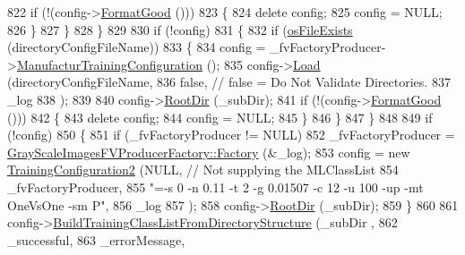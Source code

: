 \begin{DoxyCode}
822       \textcolor{keywordflow}{if}  (!(config->\hyperlink{class_k_k_b_1_1_configuration_a83da17732beb6179d42f73f699795b68}{FormatGood} ()))
823       \{
824         \textcolor{keyword}{delete}  config;
825         config = NULL;
826       \}
827     \}
828   \}
829 
830   \textcolor{keywordflow}{if}  (!config)
831   \{
832     \textcolor{keywordflow}{if}  (\hyperlink{namespace_k_k_b_aba5c7fcb492dea01f2115c492ff65d83}{osFileExists} (directoryConfigFileName))
833     \{
834       config = \_fvFactoryProducer->\hyperlink{class_k_k_m_l_l_1_1_factory_f_v_producer_a3638e312813fd78c2a4ead4fb71e2537}{ManufacturTrainingConfiguration} ();
835       config->\hyperlink{class_k_k_m_l_l_1_1_training_configuration2_a89bb53ad704979d78053e1ae8d1253c6}{Load} (directoryConfigFileName,
836                     \textcolor{keyword}{false},  \textcolor{comment}{// false = Do Not Validate Directories.}
837                     \_log 
838                    );
839 
840       config->\hyperlink{class_k_k_m_l_l_1_1_training_configuration2_a1e3c8e069a8f2894ad4f6abc3efe5559}{RootDir} (\_subDir);
841       \textcolor{keywordflow}{if}  (!(config->\hyperlink{class_k_k_b_1_1_configuration_a83da17732beb6179d42f73f699795b68}{FormatGood} ()))
842       \{
843         \textcolor{keyword}{delete}  config;
844         config = NULL;
845       \}
846     \}
847   \}
848 
849   \textcolor{keywordflow}{if}  (!config)
850   \{
851     \textcolor{keywordflow}{if}  (\_fvFactoryProducer != NULL)
852       \_fvFactoryProducer = \hyperlink{class_k_k_m_l_l_1_1_gray_scale_images_f_v_producer_factory_ae0082a1fd20abb831f0217f642156936}{GrayScaleImagesFVProducerFactory::Factory}
       (&\_log);
853     config = \textcolor{keyword}{new} \hyperlink{class_k_k_m_l_l_1_1_training_configuration2_a30f123ba51f4a4c91f8824fff105ebf3}{TrainingConfiguration2} (NULL,      \textcolor{comment}{// Not supplying the MLClassList}
854                                          \_fvFactoryProducer,
855                                          \textcolor{stringliteral}{"=-s 0 -n 0.11 -t 2 -g 0.01507  -c 12  -u 100  -up  -mt OneVsOne 
       -sm P"},
856                                          \_log
857                                         );
858     config->\hyperlink{class_k_k_m_l_l_1_1_training_configuration2_a1e3c8e069a8f2894ad4f6abc3efe5559}{RootDir} (\_subDir);
859   \}
860 
861   config->\hyperlink{class_k_k_m_l_l_1_1_training_configuration2_a05bd9d6aa3ad45fc35a826185f88cba4}{BuildTrainingClassListFromDirectoryStructure} (\_subDir
      ,
862                                                         \_successful, 
863                                                         \_errorMessage,

\end{DoxyCode}
